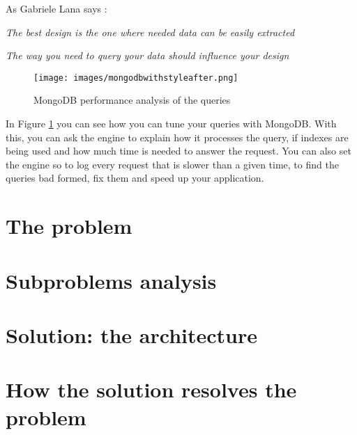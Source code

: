 As Gabriele Lana says \cite{website:mongodbwithstyle}:

\begin{center}
	\textit{The best design is the one where needed data can be easily extracted}
\end{center}

\begin{center}
	\textit{The way you need to query your data should influence your design}
\end{center}

\begin{figure}[H]
\centering %
\texttt{[image: images/mongodbwithstyleafter.png]}
\caption{MongoDB performance analysis of the queries}
\label{fig:mongodbwithstyle}
\end{figure}

In Figure \ref{fig:mongodbwithstyle} you can see how you can tune your queries with MongoDB. With this, you can ask the engine to explain how it processes the query, if indexes are being used and how much time is needed to answer the request. You can also set the engine so to log every request that is slower than a given time, to find the queries bad formed, fix them and speed up your application.


\section{The problem}

\section{Subproblems analysis}

\section{Solution: the architecture}

\section{How the solution resolves the problem}





